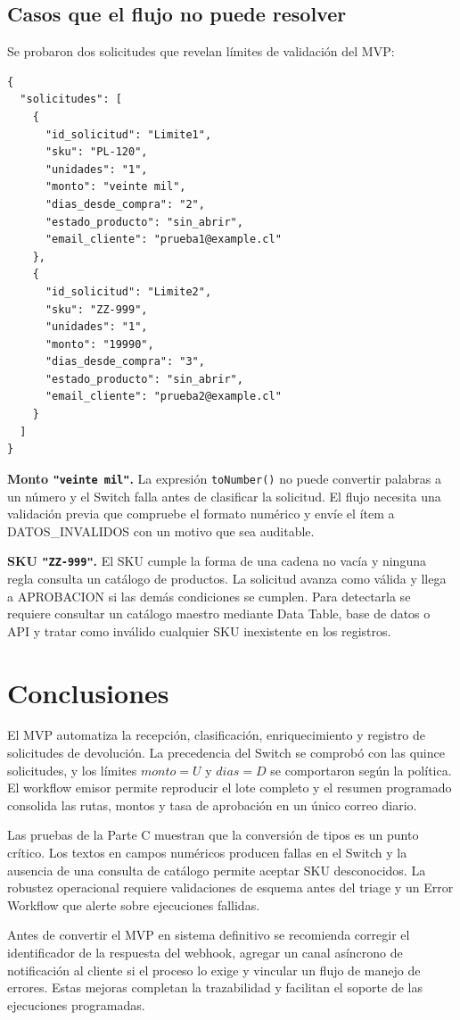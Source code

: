 \documentclass[11pt,letterpaper]{article}
\begin{document}
\subsection{Casos que el flujo no puede resolver}
Se probaron dos solicitudes que revelan límites de validación del MVP:

\begin{lstlisting}[basicstyle=\ttfamily\scriptsize,backgroundcolor=\color{codebg},frame=single,rulecolor=\color{codeframe},breaklines=true,showstringspaces=false]
{
  "solicitudes": [
    {
      "id_solicitud": "Limite1",
      "sku": "PL-120",
      "unidades": "1",
      "monto": "veinte mil",
      "dias_desde_compra": "2",
      "estado_producto": "sin_abrir",
      "email_cliente": "prueba1@example.cl"
    },
    {
      "id_solicitud": "Limite2",
      "sku": "ZZ-999",
      "unidades": "1",
      "monto": "19990",
      "dias_desde_compra": "3",
      "estado_producto": "sin_abrir",
      "email_cliente": "prueba2@example.cl"
    }
  ]
}
\end{lstlisting}

\textbf{Monto \texttt{"veinte mil"}.} La expresión \texttt{toNumber()} no puede convertir palabras a un número y el Switch falla antes de clasificar la solicitud. El flujo necesita una validación previa que compruebe el formato numérico y envíe el ítem a DATOS\_INVALIDOS con un motivo que sea auditable.

\textbf{SKU \texttt{"ZZ-999"}.} El SKU cumple la forma de una cadena no vacía y ninguna regla consulta un catálogo de productos. La solicitud avanza como válida y llega a APROBACION si las demás condiciones se cumplen. Para detectarla se requiere consultar un catálogo maestro mediante Data Table, base de datos o API y tratar como inválido cualquier SKU inexistente en los registros.

\section{Conclusiones}
El MVP automatiza la recepción, clasificación, enriquecimiento y registro de solicitudes de devolución. La precedencia del Switch se comprobó con las quince solicitudes, y los límites $monto=U$ y $dias=D$ se comportaron según la política. El workflow emisor permite reproducir el lote completo y el resumen programado consolida las rutas, montos y tasa de aprobación en un único correo diario.

Las pruebas de la Parte C muestran que la conversión de tipos es un punto crítico. Los textos en campos numéricos producen fallas en el Switch y la ausencia de una consulta de catálogo permite aceptar SKU desconocidos. La robustez operacional requiere validaciones de esquema antes del triage y un Error Workflow que alerte sobre ejecuciones fallidas.

Antes de convertir el MVP en sistema definitivo se recomienda corregir el identificador de la respuesta del webhook, agregar un canal asíncrono de notificación al cliente si el proceso lo exige y vincular un flujo de manejo de errores. Estas mejoras completan la trazabilidad y facilitan el soporte de las ejecuciones programadas.
\end{document}

